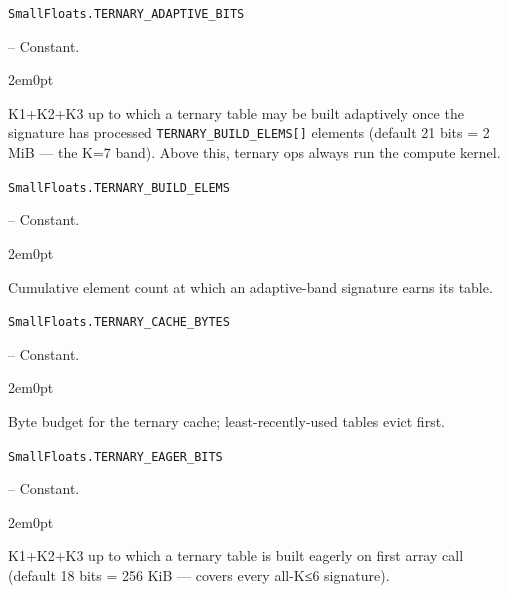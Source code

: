 \par\medskip\noindent\begin{minipage}{\linewidth}
\hypertarget{12494916835769691716}{\texttt{SmallFloats.TERNARY\_\allowbreak{}ADAPTIVE\_\allowbreak{}BITS}}  -- {Constant.}
\nopagebreak
\begin{adjustwidth}{2em}{0pt}

K1+K2+K3 up to which a ternary table may be built adaptively once the signature has processed \texttt{TERNARY\_\allowbreak{}BUILD\_\allowbreak{}ELEMS[]} elements (default 21 bits = 2 MiB — the K=7 band). Above this, ternary ops always run the compute kernel.



\end{adjustwidth}
\end{minipage}
\par\medskip

\par\medskip\noindent\begin{minipage}{\linewidth}
\hypertarget{8297071350468471162}{\texttt{SmallFloats.TERNARY\_\allowbreak{}BUILD\_\allowbreak{}ELEMS}}  -- {Constant.}
\nopagebreak
\begin{adjustwidth}{2em}{0pt}

Cumulative element count at which an adaptive-band signature earns its table.



\end{adjustwidth}
\end{minipage}
\par\medskip

\par\medskip\noindent\begin{minipage}{\linewidth}
\hypertarget{6187612789825565941}{\texttt{SmallFloats.TERNARY\_\allowbreak{}CACHE\_\allowbreak{}BYTES}}  -- {Constant.}
\nopagebreak
\begin{adjustwidth}{2em}{0pt}

Byte budget for the ternary cache; least-recently-used tables evict first.



\end{adjustwidth}
\end{minipage}
\par\medskip

\par\medskip\noindent\begin{minipage}{\linewidth}
\hypertarget{17354237254338795853}{\texttt{SmallFloats.TERNARY\_\allowbreak{}EAGER\_\allowbreak{}BITS}}  -- {Constant.}
\nopagebreak
\begin{adjustwidth}{2em}{0pt}

K1+K2+K3 up to which a ternary table is built eagerly on first array call (default 18 bits = 256 KiB — covers every all-K≤6 signature).



\end{adjustwidth}
\end{minipage}
\par\medskip

